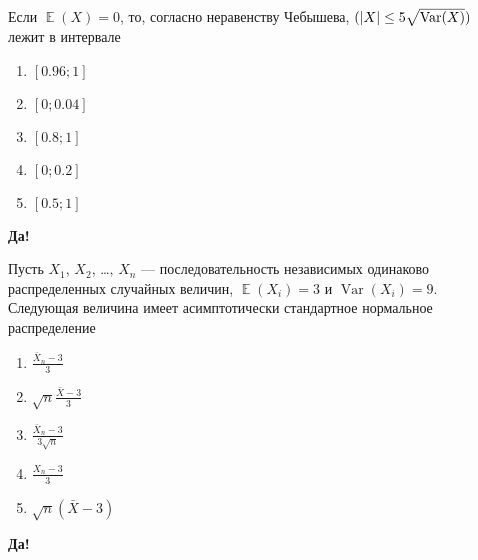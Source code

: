 \documentclass[t]{beamer}
\DeclareMathOperator{\Var}{Var}
\DeclareMathOperator{\E}{\mathbb{E}}
\let\P\relax
\DeclareMathOperator{\P}{\mathbb{P}}
\begin{document}
 \begin{frame} \label{27-Yes} 
\begin{block}{27} 

Если $\E(X)=0$, то, согласно неравенству Чебышева, $\P(|X| \leq 5 \sqrt{\Var(X)})$ лежит в интервале
 


 \end{block} 
\begin{enumerate} 
\item[] \hyperlink{27-Yes}{\beamergotobutton{} $[0.96;1]$ }
\item[] \hyperlink{27-No}{\beamergotobutton{} $[0;0.04]$}
\item[] \hyperlink{27-No}{\beamergotobutton{} $[0.8;1]$}
\item[] \hyperlink{27-No}{\beamergotobutton{} $[0;0.2]$}
\item[] \hyperlink{27-No}{\beamergotobutton{} $[0.5;1]$
}
\end{enumerate} 

 \textbf{Да!} 
 \hyperlink{28}{}\end{frame} 


 \begin{frame} \label{28-Yes} 
\begin{block}{28} 

Пусть $X_1$, $X_2$, \ldots, $X_n$ — последовательность независимых одинаково распределенных случайных величин, $\E(X_i)=3$ и $\Var(X_i)=9$. Следующая величина имеет асимптотически стандартное нормальное распределение
 


 \end{block} 
\begin{enumerate} 
\item[] \hyperlink{28-No}{\beamergotobutton{} $\frac{\bar{X}_n-3}{3}$}
\item[] \hyperlink{28-Yes}{\beamergotobutton{} $\sqrt{n}\frac{\bar{X}-3}{3}$}
\item[] \hyperlink{28-No}{\beamergotobutton{} $\frac{\bar{X}_n-3}{3\sqrt{n}}$}
\item[] \hyperlink{28-No}{\beamergotobutton{} $\frac{X_n-3}{3}$ }
\item[] \hyperlink{28-No}{\beamergotobutton{} $\sqrt{n}(\bar{X}-3)$ }
\end{enumerate} 

 \textbf{Да!} 
 \hyperlink{29}{}\end{frame} 
\end{document}
